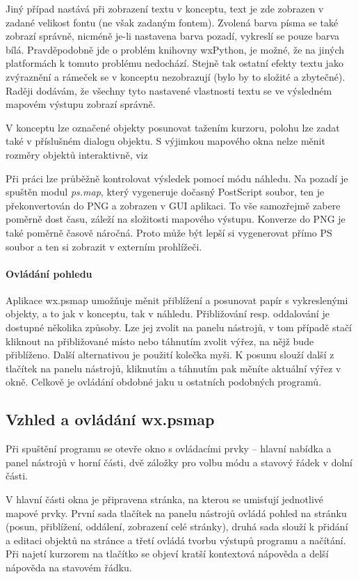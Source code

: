 \documentclass[a4paper,12pt,draft]{article}
\newcommand{\modul}[1]{\emph{#1}}
\begin{document}
Jiný případ nastává při zobrazení textu v konceptu, text je zde zobrazen v zadané velikost fontu (ne však zadaným fontem). Zvolená barva písma se také zobrazí správně, nicméně je-li nastavena barva pozadí, vykreslí se pouze barva bílá. Pravděpodobně jde o problém knihovny wxPython, je možné, že na jiných platformách k tomuto problému nedochází. Stejně tak ostatní efekty textu jako zvýraznění a rámeček se v konceptu nezobrazují (bylo by to složité a zbytečné). Raději dodávám, že všechny tyto nastavené vlastnosti textu se ve výsledném mapovém výstupu zobrazí správně.

V konceptu lze označené objekty posunovat tažením kurzoru, polohu lze zadat také v příslušném dialogu objektu. S výjimkou mapového okna nelze měnit rozměry objektů interaktivně, viz 

Při práci lze průběžně kontrolovat výsledek pomocí módu náhledu. Na pozadí je spuštěn modul \modul{ps.map}, který vygeneruje dočasný PostScript soubor, ten je překonvertován do PNG a zobrazen v GUI aplikaci. To vše samozřejmě zabere poměrně dost času, záleží na složitosti mapového výstupu. Konverze do PNG je také poměrně časově náročná. Proto může být lepší si vygenerovat přímo PS soubor a ten si zobrazit v externím prohlížeči.

\paragraph*{Ovládání pohledu}
Aplikace wx.psmap umožňuje měnit přiblížení a posunovat papír s vykreslenými objekty, a to jak v konceptu, tak v náhledu. Přibližování resp. oddalování je dostupné několika způsoby. Lze jej zvolit na panelu nástrojů, v tom případě stačí kliknout na přibližované místo nebo táhnutím zvolit výřez, na nějž bude přiblíženo. Další alternativou je použití kolečka myši. K posunu slouží další z tlačítek na panelu nástrojů, kliknutím a táhnutím pak měníte aktuální výřez v okně. Celkově je ovládání obdobné jaku u ostatních podobných programů.

\subsection{Vzhled a ovládání wx.psmap}
Při spuštění programu se otevře okno s ovládacími prvky -- hlavní nabídka a panel nástrojů v horní části, dvě záložky pro volbu módu a stavový řádek v dolní části.


V hlavní části okna je připravena stránka, na kterou se umisťují jednotlivé mapové prvky. První sada tlačítek na panelu nástrojů ovládá pohled na stránku (posun, přiblížení, oddálení, zobrazení celé stránky), druhá sada slouží k přidání a editaci objektů na stránce a třetí ovládá tvorbu výstupů programu a načítání. Při najetí kurzorem na tlačítko se objeví kratší kontextová nápověda a delší nápověda na stavovém řádku. 
\end{document}

